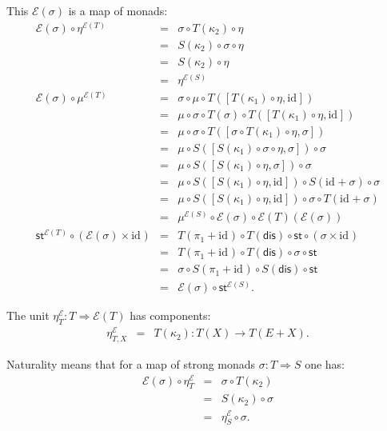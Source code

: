 \documentclass{LMCS}
\newcommand{\after}{\mathrel{\circ}}
\newcommand{\idmap}[1][]{\ensuremath{\mathrm{id}_{#1}}}
\newcommand{\st}{\ensuremath{\mathsf{st}}}
\newcommand{\dis}{\ensuremath{\mathsf{dis}}}
\newcommand{\E}{\ensuremath{\mathcal{E}}}
\begin{document}
{\noindent This $\E(\sigma)$ is a map of monads:
$$\begin{array}{rcl}
\E(\sigma) \after \eta^{\E(T)}
& = &
\sigma \after T(\kappa_{2}) \after \eta \\
& = &
S(\kappa_{2}) \after \sigma \after \eta \\
& = &
S(\kappa_{2}) \after \eta \\
& = &
\eta^{\E(S)} \\
\E(\sigma) \after \mu^{\E(T)}
& = &
\sigma \after \mu \after T([T(\kappa_{1})\after\eta, \idmap]) \\
& = &
\mu \after \sigma \after T(\sigma) \after 
   T([T(\kappa_{1})\after\eta, \idmap]) \\
& = &
\mu \after \sigma \after 
   T([\sigma \after T(\kappa_{1})\after\eta, \sigma]) \\
& = &
\mu \after S([S(\kappa_{1})\after \sigma \after\eta, \sigma]) 
   \after \sigma \\
& = &
\mu \after S([S(\kappa_{1})\after \eta, \sigma]) 
   \after \sigma \\
& = &
\mu \after S([S(\kappa_{1})\after\eta, \idmap]) 
   \after S(\idmap+\sigma) \after \sigma \\
& = &
\mu \after S([S(\kappa_{1})\after\eta, \idmap]) \after \sigma
   \after T(\idmap+\sigma) \\
& = &
\mu^{\E(S)} \after \E(\sigma) \after 
   \E(T)(\E(\sigma)) \\
\st^{\E(T)} \after (\E(\sigma)\times\idmap) 
& = &
T(\pi_{1}+\idmap) \after T(\dis) \after \st \after (\sigma\times\idmap) \\
& = &
T(\pi_{1}+\idmap) \after T(\dis) \after \sigma \after \st \\
& = &
\sigma \after S(\pi_{1}+\idmap) \after S(\dis) \after \st \\
& = &
\E(\sigma) \after \st^{\E(S)}.
\end{array}$$

The unit $\eta^{\E}_{T} \colon
T \Rightarrow \E(T)$ has components:
$$\begin{array}{rcl}
\eta^{\E}_{T,X}
& = &
T(\kappa_{2}) \colon T(X) \longrightarrow T(E+X).
\end{array}$$

\noindent Naturality means that for a map of strong monads
$\sigma\colon T\Rightarrow S$ one has:
$$\begin{array}{rcl}
\E(\sigma) \after \eta^{\E}_{T} 
& = &
\sigma \after T(\kappa_{2}) \\
& = &
S(\kappa_{2}) \after \sigma \\
& = &
\eta^{\E}_{S} \after \sigma.
\end{array}$$

}
\end{document}
